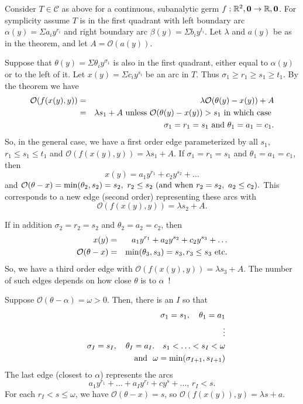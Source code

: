 \documentclass[article]{amsart}
\newcommand{\R}{\mathbb R}
\newcommand{\0}{{\bf 0}}
\begin{document}
Consider $T\in \mathcal{C}$ as above for a continuous, subanalytic germ $f: \R^2,\0 \rightarrow \R, \bf{0}$.  For symplicity assume $T$ is in the first quadrant with left boundary arc $\alpha(y) = \Sigma a_i y^{r_i}$ and right
boundary arc $\beta(y) = \Sigma b_iy^{t_i}$. Let $\lambda$ and $a(y)$ be as in the theorem, and let $A=\mathcal{O}(a(y))$.

Suppose that $\theta(y) = \Sigma\theta_iy^{\sigma_1}$ is also in the first quadrant, either equal to $\alpha (y)$ or to the left of it.  Let $x(y) = \Sigma c_iy^{s_i}$ be an arc in  $T$. 
Thus $\sigma_1\ge r_1 \ge s_1\ge t_1$. By the theorem we have 
\begin{eqnarray*}
	\mathcal{O}(f(x(y),y)) &=& \lambda \mathcal{O}(\theta (y)-x(y)) + A\\
	&=&\lambda s_1 + A\ {\rm unless}\ \mathcal{O}(\theta (y)-x(y))> s_1 {\rm \ in\ which\ case}\  \\
	&&\quad \ \sigma_1 = r_1 = s_1 \ {\rm and}\  \theta_1 = a_1 = c_1.\\ 
\end{eqnarray*}
So, in the general case, we have a first order edge parameterized by all $s_1$, $r_1 \le s_1 \le t_1$ and
$	\mathcal{O}(f(x(y),y)) = \lambda s_1 + A$.
If $\sigma_1 = r_1 = s_1$ and $\theta_1 = a_1 = c_1$, then 
$$x(y) = a_1y^{r_1} + c_2y^{s_2} + \ldots$$
and $\mathcal{O}(\theta- x) = \min (\theta_2, s_2) = s_2,\ r_2\le s_2\  ({\rm and\ when}\ r_2 = s_2, \ a_2 \le c_2 ).$
This corresponds to a new edge (second order) representing these arcs with $$\mathcal{O}(f(x(y), y)) = \lambda s_2 + A.$$

If in addition $\sigma_2 = r_2 = s_2$ and $\theta_2 = a_2 = c_2$, then
\begin{eqnarray*}
	x(y) &=& a_1y^{r_1} + a_2y^{s_2} + c_2y^{s_3} + \ldots\\
	\mathcal{O}(\theta- x)&=& \min (\theta_3, s_3) = s_3, r_3\le s_3\ {\rm etc.}
\end{eqnarray*}
So, we have a third order edge with $\mathcal{O}(f(x(y),y)) = \lambda s_3 + A.$ The number of such edges depends on how close $\theta$ is to $\alpha$\ ! 

Suppose $\mathcal{O}(\theta-\alpha ) = \omega > 0$.  Then, there is an $I$ so that 
\begin{eqnarray*}
	&&\sigma_1= s_1, \quad \theta_1 = a_1\\
	&&\vdots\\
	&& \sigma_I =s_I, \quad \theta_I = a_I. \quad s_1 < \ldots < s_I <\omega\\
	&&\qquad {\rm and}\ \ \omega = \min (\sigma_{I+1}, s_{I+1})\\
\end{eqnarray*}
The last edge (closest to $\alpha$) represents the arcs
$$a_1y^{r_1} + \ldots +a_Iy^{r_I} + cy^s + \ldots,\, r_I < s.$$
For each $r_I < s \le \omega $, we have $\mathcal{O}(\theta- x) = s $, so $\mathcal{O}(f(x(y)),y) = \lambda s +a$.  
\end{document}
